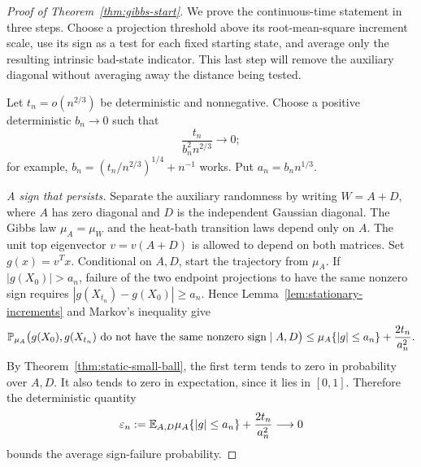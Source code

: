 \begin{proof}[Proof of Theorem~\ref{thm:gibbs-start}]
We prove the continuous-time statement in three steps. Choose a
projection threshold above its root-mean-square increment scale, use its
sign as a test for each fixed starting state, and average only the
resulting intrinsic bad-state indicator. This last step will remove the
auxiliary diagonal without averaging away the distance being tested.

Let $t_n=o(n^{2/3})$ be deterministic and nonnegative. Choose a positive
deterministic $b_n\to0$ such that
\[
 \frac{t_n}{b_n^2n^{2/3}}\longrightarrow0;
\]
for example, $b_n=(t_n/n^{2/3})^{1/4}+n^{-1}$ works.  Put
$a_n=b_nn^{1/3}$.

\smallskip\noindent\emph{A sign that persists.}
Separate the auxiliary randomness by writing $W=A+D$, where $A$
has zero diagonal and $D$ is the independent Gaussian diagonal.  The
Gibbs law $\mu_A=\mu_W$ and the heat-bath transition laws depend only on
$A$.  The unit top eigenvector $v=v(A+D)$ is allowed to depend on both
matrices.  Set $g(x)=v^Tx$.  Conditional on $A,D$, start the trajectory
from $\mu_A$.  If $|g(X_0)|>a_n$, failure of the two endpoint projections
to have the same nonzero sign requires
$|g(X_{t_n})-g(X_0)|\ge a_n$.  Hence
Lemma~\ref{lem:stationary-increments} and Markov's inequality give
\begin{equation}\label{eq:sign-failure}
 \mathbb P_{\mu_A}\bigl(g(X_0),g(X_{t_n})
     \text{ do not have the same nonzero sign}\mid A,D\bigr)
 \le \mu_A\{|g|\le a_n\}+\frac{2t_n}{a_n^2}.
\end{equation}
By Theorem~\ref{thm:static-small-ball}, the first term tends to zero in
probability over $A,D$.  It also tends to zero in expectation, since it
lies in $[0,1]$.  Therefore the deterministic quantity
\begin{equation}\label{eq:sign-error-average}
 \varepsilon_n
 :=\mathbb E_{A,D}\mu_A\{|g|\le a_n\}+\frac{2t_n}{a_n^2}
 \longrightarrow0
\end{equation}
bounds the average sign-failure probability.


\end{proof}
